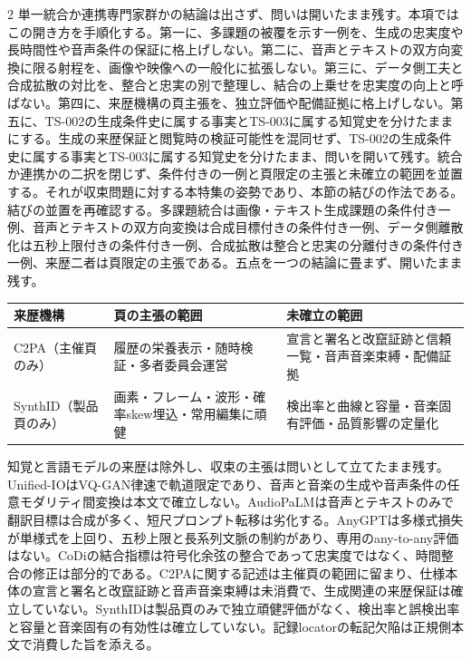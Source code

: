 \documentclass[lualatex,a4paper,10pt]{jlreq}
\begin{document}
\begin{multicols}{2}
単一統合か連携専門家群かの結論は出さず、問いは開いたまま残す\autocite{btd094,btd095,btd096,btd097,btd098,btd099}。本項ではこの開き方を手順化する。第一に、多課題の被覆を示す一例を、生成の忠実度や長時間性や音声条件の保証に格上げしない。第二に、音声とテキストの双方向変換に限る射程を、画像や映像への一般化に拡張しない。第三に、データ側工夫と合成拡散の対比を、整合と忠実の別で整理し、結合の上乗せを忠実度の向上と呼ばない。第四に、来歴機構の頁主張を、独立評価や配備証拠に格上げしない。第五に、TS-002の生成条件史に属する事実とTS-003に属する知覚史を分けたままにする。生成の来歴保証と閲覧時の検証可能性を混同せず、TS-002の生成条件史に属する事実とTS-003に属する知覚史を分けたまま、問いを開いて残す\autocite{btd094,btd095,btd096,btd097,btd098,btd099}。統合か連携かの二択を閉じず、条件付きの一例と頁限定の主張と未確立の範囲を並置する。それが収束問題に対する本特集の姿勢であり、本節の結びの作法である。結びの並置を再確認する。多課題統合は画像・テキスト生成課題の条件付き一例、音声とテキストの双方向変換は合成目標付きの条件付き一例、データ側離散化は五秒上限付きの条件付き一例、合成拡散は整合と忠実の分離付きの条件付き一例、来歴二者は頁限定の主張である。五点を一つの結論に畳まず、開いたまま残す\autocite{btd094,btd095,btd096,btd097,btd098,btd099}。
\end{multicols}

\begin{center}
\small
\begin{tabularx}{\textwidth}{@{}p{}p{}X@{}}
\toprule
来歴機構 & 頁の主張の範囲 & 未確立の範囲 \\
\midrule
C2PA（主催頁のみ） & 履歴の栄養表示・随時検証・多者委員会運営 & 宣言と署名と改竄証跡と信頼一覧・音声音楽束縛・配備証拠 \\
SynthID（製品頁のみ） & 画素・フレーム・波形・確率skew埋込・常用編集に頑健 & 検出率と曲線と容量・音楽固有評価・品質影響の定量化 \\
\bottomrule
\end{tabularx}
\end{center}
\autocite{btd098,btd099}

\begin{claimboundary}[本節の読解上の境界]
知覚と言語モデルの来歴は除外し、収束の主張は問いとして立てたまま残す。Unified-IOはVQ-GAN律速で軌道限定であり、音声と音楽の生成や音声条件の任意モダリティ間変換は本文で確立しない。AudioPaLMは音声とテキストのみで翻訳目標は合成が多く、短尺プロンプト転移は劣化する。AnyGPTは多様式損失が単様式を上回り、五秒上限と長系列文脈の制約があり、専用のany-to-any評価はない。CoDiの結合指標は符号化余弦の整合であって忠実度ではなく、時間整合の修正は部分的である。C2PAに関する記述は主催頁の範囲に留まり、仕様本体の宣言と署名と改竄証跡と音声音楽束縛は未消費で、生成関連の来歴保証は確立していない。SynthIDは製品頁のみで独立頑健評価がなく、検出率と誤検出率と容量と音楽固有の有効性は確立していない。記録locatorの転記欠陥は正規側本文で消費した旨を添える。
\end{claimboundary}
\end{document}
